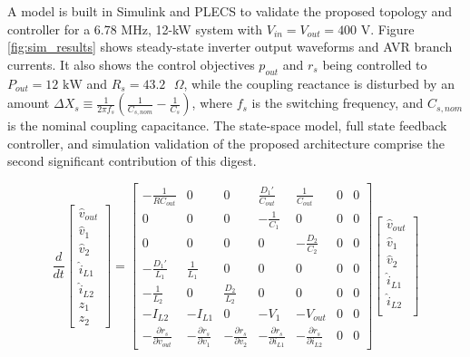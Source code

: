 \documentclass[journal, onecolumn, final, letterpaper, 11pt]{IEEEtran}
\begin{document}
A model is built in Simulink and PLECS to validate the proposed topology and controller for a 6.78 MHz, 12-kW system with $V_{in} = V_{out} = 400$ V. Figure \ref{fig:sim_results} shows steady-state inverter output waveforms and AVR branch currents. It also shows the control objectives $p_{out}$ and $r_s$ being controlled to $P_{out} = 12 \text{ kW}$ and $R_s = 43.2 \text{ }\Omega$, while the coupling reactance is disturbed by an amount $\Delta X_s \equiv \frac{1}{2 \pi f_s}(\frac{1}{C_{s,nom}} - \frac{1}{C_s})$, where $f_s$ is the switching frequency, and $C_{s,nom}$ is the nominal coupling capacitance. The state-space model, full state feedback controller, and simulation validation of the proposed architecture comprise the second significant contribution of this digest.

\scriptsize
\begin{equation}
\label{eqn:aug_ss_model}
\frac{d}{dt}
\begin{bmatrix}
	\hat{v}_{out} \\
	\hat{v}_1 \\
	\hat{v}_2 \\
	\hat{i}_{L1} \\
	\hat{i}_{L2} \\
	z_1 \\
	z_2
\end{bmatrix}
=
\begin{bmatrix}
	-\frac{1}{RC_{out}} & 0 & 0 & \frac{D_1'}{C_{out}} & \frac{1}{C_{out}} & 0 & 0 \\
	0 & 0 & 0 & -\frac{1}{C_1} & 0 & 0 & 0 \\
	0 & 0 & 0 & 0 & -\frac{D_2}{C_2} & 0 & 0\\
	-\frac{D_1'}{L_1} & \frac{1}{L_1} & 0 & 0 & 0 & 0 & 0 \\
	-\frac{1}{L_2} & 0 & \frac{D_2}{L_2} & 0 & 0 & 0 & 0 \\
	-I_{L2} & -I_{L1} & 0 & -V_1 & -V_{out} & 0 & 0 \\
	-\frac{\partial r_s}{\partial v_{out}} & -\frac{\partial r_s}{\partial v_{1}} & -\frac{\partial r_s}{\partial v_{2}} & -\frac{\partial r_s}{\partial i_{L1}} & -\frac{\partial r_s}{\partial i_{L2}} & 0 & 0
\end{bmatrix}
\begin{bmatrix}
	\hat{v}_{out} \\
	\hat{v}_1 \\
	\hat{v}_2 \\
	\hat{i}_{L1} \\
	\hat{i}_{L2} \\

\end{bmatrix}
\end{equation}
\end{document}
